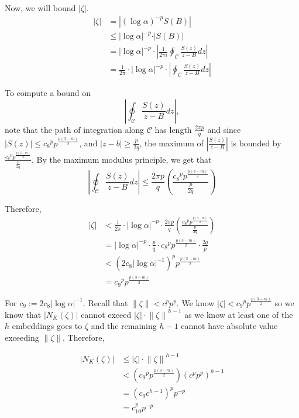 \documentclass[a4paper, 11pt]{book}
\begin{document}
Now, we will bound $\vert \zeta \vert$.
\begin{align*}
    \vert \zeta \vert &= \left\vert {(\log \alpha)}^{-p} S(B) \right\vert \\
                      &\leq {\vert \log \alpha \vert}^{-p} \cdot \vert S(B) \vert \\
                      &= {\vert \log \alpha \vert}^{-p} \cdot \left\vert \frac{1}{2 \pi i} \oint_{\mathcal{C}} \frac{S(z)}{z-B} dz \right\vert \\
                      &= \frac{1}{2\pi} \cdot {\vert \log \alpha \vert}^{-p} \cdot \left\vert\oint_{\mathcal{C}} \frac{S(z)}{z-B} dz \right\vert 
\end{align*}

To compute a bound on \[\left\vert \oint_{\mathcal{C}} \frac{S(z)}{z-B} dz\right\vert,\] note that the path of integration along $\mathcal{C}$ has length $\frac{2 \pi p}{q}$ and since $\vert S(z) \vert \leq {c_8}^{p}p^{\frac{p(3-m)}{2}}$, and $\vert z - b \vert \geq \frac{p}{2q}$, the maximum of $\left\vert \frac{S(z)}{z-B} \right\vert$ is bounded by $\frac{{c_8}^{p}p^{\frac{p(3-m)}{2}}}{\frac{p}{2q}}$. By the maximum modulus principle, we get that \[\left\vert \oint_{\mathcal{C}} \frac{S(z)}{z-B} dz\right\vert \leq \frac{2 \pi p}{q} \left(\frac{{c_8}^{p}p^{\frac{p(3-m)}{2}}}{\frac{p}{2q}}\right)\]

Therefore, 
\begin{align*}
    \vert \zeta \vert &< \frac{1}{2\pi} \cdot {\vert \log \alpha \vert}^{-p} \cdot \frac{2 \pi p}{q} \left(\frac{{c_8}^{p}p^{\frac{p(3-m)}{2}}}{\frac{p}{2q}}\right)\\
                      &= {\vert \log \alpha \vert}^{-p} \cdot \frac{p}{q} \cdot {c_8}^{p}p^{\frac{p(3-m)}{2}} \cdot \frac{2q}{p} \\
                      &< {\left(2c_8 {\vert \log \alpha \vert}^{-1}\right)}^{p}p^{\frac{p(3-m)}{2}} \\
                      &= {c_9}^{p}{p}^{\frac{p(3-m)}{2}} 
\end{align*}

For $c_9 := 2c_8 {\vert \log \alpha \vert}^{-1}$. Recall that $\| \zeta \| < c^{p}p^{p}$. We know $\vert \zeta \vert < {c_9}^{p}{p}^{\frac{p(3-m)}{2}}$ so we know that $\vert N_K(\zeta) \vert$ cannot exceed $\vert \zeta \vert \cdot {\| \zeta \|}^{h-1}$ as we know at least one of the $h$ embeddings goes to $\zeta$ and the remaining $h-1$ cannot have absolute value exceeding $\| \zeta \|$. Therefore, 

\begin{align*}
    \vert N_K(\zeta) \vert &\leq \vert \zeta \vert \cdot {\| \zeta \|}^{h-1} \\
                           &< \left({c_9}^{p}{p}^{\frac{p(3-m)}{2}}\right){\left(c^{p}p^{p}\right)}^{h-1} \\
                           &= {(c_{9}c^{h-1})}^{p}p^{-p} \\
                           &= {c_{10}^{p}p^{-p}}
\end{align*}
\end{document}
